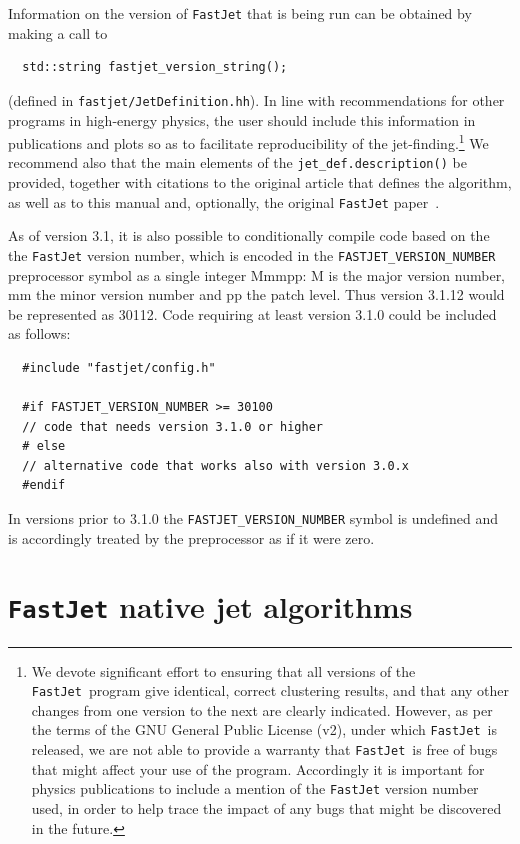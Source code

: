 \documentclass[12pt,a4]{article}
\newcommand{\fastjet}{\texttt{FastJet}\xspace}
\newcommand{\ttt}[1]{{\small\texttt{#1}}}
\begin{document}
Information on the version of \fastjet that is being run can be
obtained by making a call to 
\begin{lstlisting}
  std::string fastjet_version_string();
\end{lstlisting}
(defined in \ttt{fastjet/JetDefinition.hh}).  
%
In line with recommendations for other programs in high-energy
physics, the user should include this information in publications and
plots so as to facilitate reproducibility of the
jet-finding.\footnote{We devote significant effort to ensuring that
  all versions of the \fastjet\ program give identical, correct
  clustering results, and that any other changes from one version to
  the next are clearly indicated.
  However, as per the terms of the GNU General Public License (v2),
  under which \fastjet\ is released, we are not able to provide
  a warranty that \fastjet\ is free of bugs that might affect your use
  of the program.
  Accordingly it is important for physics publications to include a
  mention of the \fastjet version number used, in order to help trace
  the impact of any bugs that might be discovered in the future.  }
%
We recommend also that the main elements of the
\ttt{jet\_def.description()} be provided, together with citations to
the original article that defines the algorithm, as well as to this
manual and, optionally, the original \fastjet paper~\cite{fastjet}.

As of version 3.1, it is also possible to conditionally compile code
based on the the \fastjet version number, which is encoded in the
\ttt{FASTJET\_VERSION\_NUMBER} preprocessor symbol as a single integer
Mmmpp: M is the major version number, mm the minor version
number and pp the patch level.
%
Thus version 3.1.12 would be represented as 30112.
%
Code requiring at least version 3.1.0 could be included as follows:
\begin{lstlisting}
  #include "fastjet/config.h"
  
  #if FASTJET_VERSION_NUMBER >= 30100
  // code that needs version 3.1.0 or higher
  # else
  // alternative code that works also with version 3.0.x
  #endif
\end{lstlisting}
In versions prior to 3.1.0 the \ttt{FASTJET\_VERSION\_NUMBER} symbol
is undefined and is accordingly treated by the preprocessor as if it
were zero.

\section{\fastjet native jet algorithms}
\label{sec:native-algs}
\end{document}
